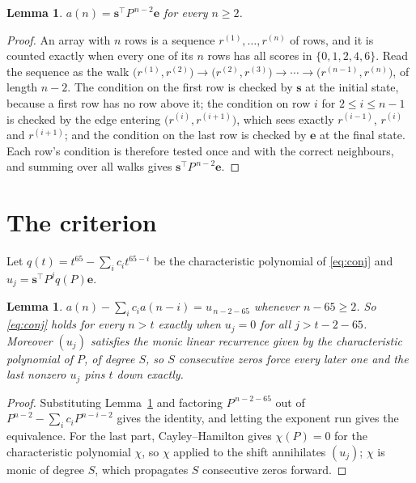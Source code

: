 \documentclass[11pt,a4paper]{article}
\theoremstyle{plain}
\newtheorem{lemma}[theorem]{Lemma}
\theoremstyle{definition}
\begin{document}
\begin{lemma}\label{lem:walk}
$a(n)=\mathbf{s}^{\!\top}P^{\,n-2}\mathbf{e}$ for every $n\ge2$.
\end{lemma}

\begin{proof}
An array with $n$ rows is a sequence $r^{(1)},\dots,r^{(n)}$ of rows, and it is counted
exactly when every one of its $n$ rows has all scores in $\{0,1,2,4,6\}$. Read the sequence as the
walk $\bigl(r^{(1)},r^{(2)}\bigr)\to\bigl(r^{(2)},r^{(3)}\bigr)\to\cdots\to
\bigl(r^{(n-1)},r^{(n)}\bigr)$, of length $n-2$. The condition on the first row is
checked by $\mathbf{s}$ at the initial state, because a first row has no row above it; the
condition on row $i$ for $2\le i\le n-1$ is checked by the edge entering
$\bigl(r^{(i)},r^{(i+1)}\bigr)$, which sees exactly $r^{(i-1)}$, $r^{(i)}$ and
$r^{(i+1)}$; and the condition on the last row is checked by $\mathbf{e}$ at the final
state. Each row's condition is therefore tested once and with the correct neighbours, and
summing over all walks gives $\mathbf{s}^{\!\top}P^{\,n-2}\mathbf{e}$.
\end{proof}

\section{The criterion}

Let $q(t)=t^{65}-\sum_i c_i t^{65-i}$ be the characteristic polynomial of
\eqref{eq:conj} and $u_j=\mathbf{s}^{\!\top}P^{j}q(P)\mathbf{e}$.

\begin{lemma}\label{lem:crit}
$a(n)-\sum_i c_i a(n-i)=u_{\,n-2-65}$ whenever $n-65\ge2$. So \eqref{eq:conj}
holds for every $n>t$ exactly when $u_j=0$ for all $j>t-2-65$. Moreover $(u_j)$
satisfies the monic linear recurrence given by the characteristic polynomial of $P$, of
degree $S$, so $S$ consecutive zeros force every later one and the last nonzero $u_j$ pins
$t$ down exactly.
\end{lemma}

\begin{proof}
Substituting Lemma~\ref{lem:walk} and factoring $P^{\,n-2-65}$ out of
$P^{n-2}-\sum_i c_i P^{n-i-2}$ gives the identity, and letting the exponent run gives the
equivalence. For the last part, Cayley--Hamilton gives $\chi(P)=0$ for the characteristic
polynomial $\chi$, so $\chi$ applied to the shift annihilates $(u_j)$; $\chi$ is monic of
degree $S$, which propagates $S$ consecutive zeros forward.
\end{proof}
\end{document}
